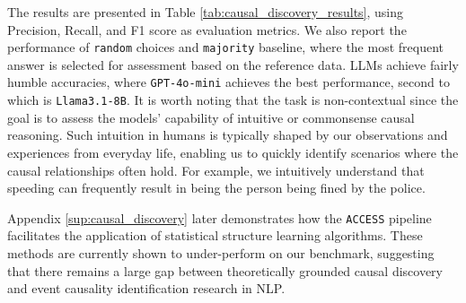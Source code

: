 The results are presented in Table \ref{tab:causal_discovery_results}, using Precision, Recall, and F1 score as evaluation metrics. We also report the performance of \texttt{random} choices and \texttt{majority} baseline, where the most frequent answer is selected for assessment based on the reference data.  LLMs achieve fairly humble accuracies, where \texttt{GPT-4o-mini} achieves the best performance, second to which is \texttt{Llama3.1-8B}. It is worth noting that the task is non-contextual since the goal is to assess the models' capability of intuitive or commonsense causal reasoning. Such intuition in humans is typically shaped by our observations and experiences from everyday life, enabling us to quickly identify scenarios where the causal relationships often hold. For example, we intuitively understand that speeding can frequently result in being the person being fined by the police. 

Appendix \ref{sup:causal_discovery} later demonstrates how the \texttt{ACCESS} pipeline facilitates the application of statistical structure learning algorithms. These methods are currently shown to under-perform on our benchmark, suggesting that there remains a large gap between theoretically grounded causal discovery and event causality identification research in NLP.   

\begin{table}[hbt!]
\centering
{}
\caption{Experiment results of causal discovery on \texttt{ACCESS} dataset. Precision, Recall, and F1 are computed under macro-average setting. \textbf{Bold} indicates best performance. $\uparrow$ Higher is better.}
\label{tab:causal_discovery_results}
\end{table}

